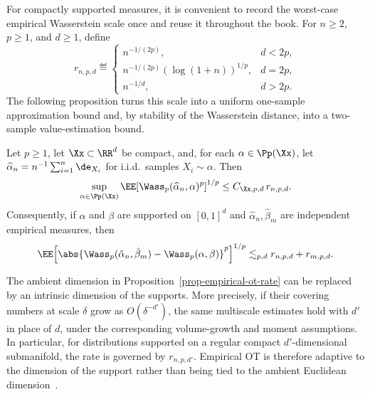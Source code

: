For compactly supported measures, it is convenient to record the worst-case empirical Wasserstein scale once and reuse it throughout the book. For \(n\geq2\), \(p\geq1\), and \(d\geq1\), define
\begin{equation}\label{eq-empirical-wasserstein-scale}
	r_{n,p,d}
	\eqdef
	\begin{cases}
		n^{-1/(2p)}, & d<2p,\\
		n^{-1/(2p)}(\log(1+n))^{1/p}, & d=2p,\\
		n^{-1/d}, & d>2p.
	\end{cases}
\end{equation}
The following proposition turns this scale into a uniform one-sample approximation bound and, by stability of the Wasserstein distance, into a two-sample value-estimation bound.

\begin{prop}\label{prop-empirical-ot-rate}
	Let \(p\geq1\), let \(\Xx\subset\RR^d\) be compact, and, for each \(\alpha\in\Pp(\Xx)\), let \(\widehat\alpha_n=n^{-1}\sum_{i=1}^n\de_{X_i}\) for i.i.d.\ samples \(X_i\sim\alpha\). Then
	\begin{equation}\label{eq-empirical-wasserstein-moment-scale}
		\sup_{\alpha\in\Pp(\Xx)}
		\EE\!\left[\Wass_p(\widehat\alpha_n,\alpha)^p\right]^{1/p}
		\leq
		C_{\Xx,p,d}\,r_{n,p,d}.
	\end{equation}
	Consequently, if \(\alpha\) and \(\beta\) are supported on \([0,1]^d\) and \(\hat\alpha_n,\hat\beta_m\) are independent empirical measures, then
	\[
		\EE\!\left[
			\abs{\Wass_p(\hat\alpha_n,\hat\beta_m)-\Wass_p(\alpha,\beta)}^p
		\right]^{1/p}
		\lesssim_{p,d}
		r_{n,p,d}+r_{m,p,d}.
	\]
\end{prop}

\begin{rem}\label{rem-empirical-ot-intrinsic-dimension}
	The ambient dimension in Proposition~\ref{prop-empirical-ot-rate} can be replaced by an intrinsic dimension of the supports. More precisely, if their covering numbers at scale \(\delta\) grow as \(O(\delta^{-d'})\), the same multiscale estimates hold with \(d'\) in place of \(d\), under the corresponding volume-growth and moment assumptions. In particular, for distributions supported on a regular compact \(d'\)-dimensional submanifold, the rate is governed by \(r_{n,p,d'}\). Empirical OT is therefore adaptive to the dimension of the support rather than being tied to the ambient Euclidean dimension~\cite{dudley1969speed,weed2017sharp}.
\end{rem}

